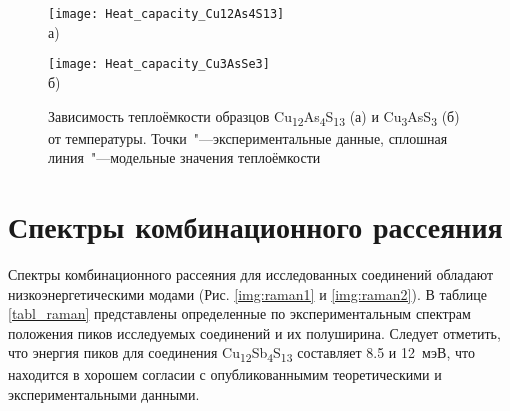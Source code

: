 \begin{figure}[p!]
  \begin{minipage}[ht]{0.9\linewidth}\centering
    \texttt{[image: Heat\_capacity\_Cu12As4S13]} \\ а)
  \end{minipage}
  \vfill
  \begin{minipage}[ht]{0.9\linewidth}\centering
    \texttt{[image: Heat\_capacity\_Cu3AsSe3]} \\ б)
  \end{minipage}

      \caption[Зависимость теплоёмкости образцов Cu\textsubscript{12}As\textsubscript{4}S\textsubscript{13} (а) и Cu\textsubscript{3}AsS\textsubscript{3} (б) от температуры. Точки~"---экспериментальные данные, сплошная линия~"---модельные значения теплоёмкости]{Зависимость теплоёмкости образцов Cu\textsubscript{12}As\textsubscript{4}S\textsubscript{13} (а) и Cu\textsubscript{3}AsS\textsubscript{3} (б) от температуры. Точки~"---экспериментальные данные, сплошная линия~"---модельные значения теплоёмкости}
    \label{img:heat}
\end{figure}



\newpage

\section{Спектры комбинационного рассеяния} \label{sect3_5}

Спектры комбинационного рассеяния для исследованных соединений обладают низкоэнергетическими модами (Рис. \ref{img:raman1} и \ref{img:raman2}).
В таблице \ref{tabl_raman} представлены определенные по экспериментальным спектрам положения пиков исследуемых соединений и их полуширина.
Следует отметить, что энергия пиков для соединения Cu\textsubscript{12}Sb\textsubscript{4}S\textsubscript{13} составляет 8.5  и 12~мэВ, что находится в хорошем согласии с опубликованнымим теоретическими\cite{Lai_2015} и экспериментальными\cite{May2016} данными.

